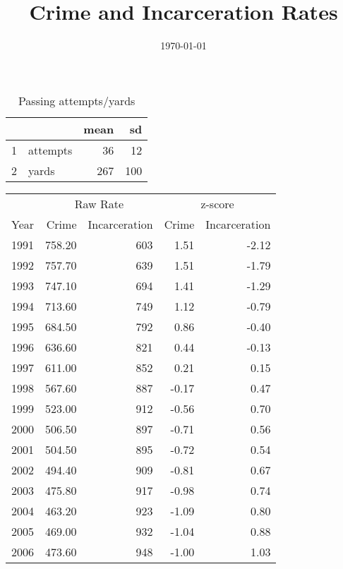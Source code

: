 \documentclass{exam}
\author{}
\title{Crime and Incarceration Rates}
\date{\today}
\begin{document}
  \maketitle

  \begin{table}[H]
    \centering
    \begin{tabular}{rlrr}
      \toprule
        &          & mean & sd \\
      \midrule
      1 & attempts & 36   & 12 \\
      2 & yards    & 267  & 100 \\
      \bottomrule
    \end{tabular}
    \caption{Passing attempts/yards}
  \end{table}

  \begin{table}[H]
    \centering
    \begin{tabular}{rrrrr}
      \toprule
      & \multicolumn{2}{c}{Raw Rate} & \multicolumn{2}{c}{z-score } \\
      \cmidrule(r){2-3} \cmidrule(r){4-5} 
      Year & Crime  & Incarceration & Crime & Incarceration \\
      \midrule
      1991 & 758.20 & 603           & 1.51  & -2.12 \\
      1992 & 757.70 & 639           & 1.51  & -1.79 \\
      1993 & 747.10 & 694           & 1.41  & -1.29 \\
      1994 & 713.60 & 749           & 1.12  & -0.79 \\
      1995 & 684.50 & 792           & 0.86  & -0.40 \\
      1996 & 636.60 & 821           & 0.44  & -0.13 \\
      1997 & 611.00 & 852           & 0.21  & 0.15 \\
      1998 & 567.60 & 887           & -0.17 & 0.47 \\
      1999 & 523.00 & 912           & -0.56 & 0.70 \\
      2000 & 506.50 & 897           & -0.71 & 0.56 \\
      2001 & 504.50 & 895           & -0.72 & 0.54 \\
      2002 & 494.40 & 909           & -0.81 & 0.67 \\
      2003 & 475.80 & 917           & -0.98 & 0.74 \\
      2004 & 463.20 & 923           & -1.09 & 0.80 \\
      2005 & 469.00 & 932           & -1.04 & 0.88 \\
      2006 & 473.60 & 948           & -1.00 & 1.03 \\
      \bottomrule
    \end{tabular}
  \end{table}
\end{document}
